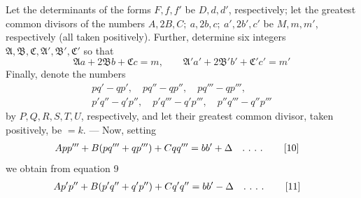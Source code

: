 Let the determinants of the forms $F,f,f'$ be $D,d,d'$, respectively; let the greatest common divisors of the numbers $A,2B,C;\ a,2b,c;\ a',2b',c'$ be $M,m,m'$, respectively (all taken positively). Further, determine six integers $\mathfrak{A},\mathfrak{B},\mathfrak{C},\mathfrak{A}',\mathfrak{B}',\mathfrak{C}'$ so that
\[
\mathfrak{A}a+2\mathfrak{B}b+\mathfrak{C}c=m,\qquad
\mathfrak{A}'a'+2\mathfrak{B}'b'+\mathfrak{C}'c'=m'
\]
Finally, denote the numbers
\[
\begin{gathered}pq'-qp',\quad pq''-qp'',\quad pq'''-qp''',\\p'q''-q'p'',\quad p'q'''-q'p''',\quad p''q'''-q''p'''\end{gathered}
\]
by $P,Q,R,S,T,U$, respectively, and let their greatest common divisor, taken positively, be $=k$. --- Now, setting
\begin{align*}
App'''+B(pq'''+qp''')+Cqq'''&=bb'+\Delta\quad\ldotp\,\ldotp\,\ldotp\,\ldotp\tag*{[10]}
\end{align*}
we obtain from equation 9
\begin{align*}
Ap'p''+B(p'q''+q'p'')+Cq'q''&=bb'-\Delta\quad\ldotp\,\ldotp\,\ldotp\,\ldotp\tag*{[11]}
\end{align*}

